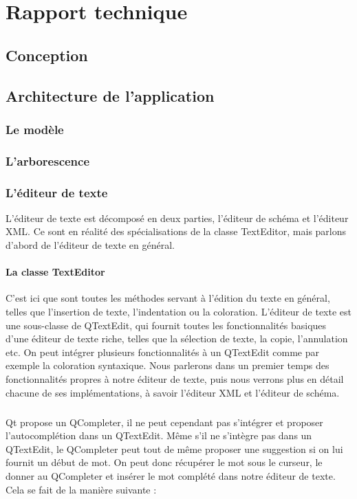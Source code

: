 \chapter{Rapport technique}

\section{Conception}


\section{Architecture de l'application}
\subsection{Le modèle}
\subsection{L'arborescence}

\subsection{L'éditeur de texte}

L'éditeur de texte est décomposé en deux parties, l'éditeur de schéma et l'éditeur XML. Ce sont en réalité des spécialisations de la classe TextEditor, mais parlons d'abord de l'éditeur de texte en général.
\subsubsection{La classe TextEditor}
C'est ici que sont toutes les méthodes servant à l'édition du texte en général, telles que l'insertion de texte, l'indentation ou la coloration. L'éditeur de texte est une sous-classe de QTextEdit, qui fournit toutes les fonctionnalités basiques d'une éditeur de texte riche, telles que la sélection de texte, la copie, l'annulation etc. On peut intégrer plusieurs fonctionnalités à un QTextEdit comme par exemple la coloration syntaxique. Nous parlerons dans un premier temps des fonctionnalités propres à notre éditeur de texte, puis nous verrons plus en détail chacune de ses implémentations, à savoir l'éditeur XML et l'éditeur de schéma.

\paragraph{}
Qt propose un QCompleter, il ne peut cependant pas s'intégrer et proposer l'autocomplétion dans un QTextEdit. Même s'il ne s'intègre pas dans un QTextEdit, le QCompleter peut tout de même proposer une suggestion si on lui fournit un début de mot. On peut donc récupérer le mot sous le curseur, le donner au QCompleter et insérer le mot complété dans notre éditeur de texte. Cela se fait de la manière suivante :

